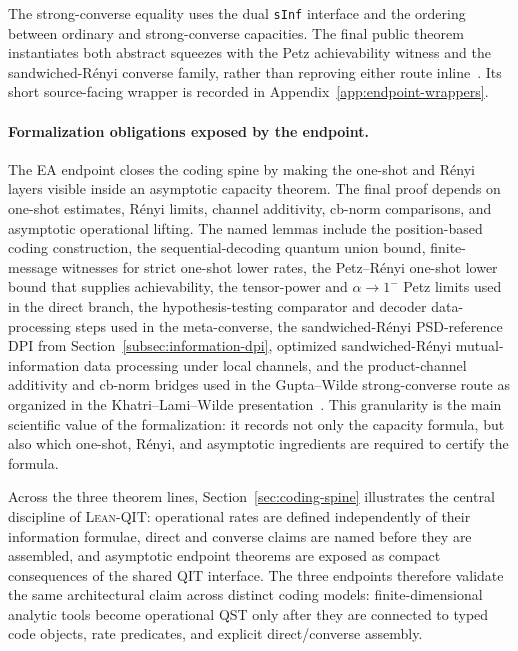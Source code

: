 \documentclass[10pt,a4paper]{article}
\DeclareRobustCommand{\LeanQIT}{\textnormal{\textsc{Lean-QIT}}}
\begin{document}
The strong-converse equality uses the dual \texttt{sInf} interface and the
ordering between ordinary and strong-converse capacities.  The final public
theorem instantiates both abstract squeezes with the Petz achievability witness
and the sandwiched-R\'enyi converse family, rather than reproving either route
inline~\cite{Bennett1999,Bennett2002,GuptaWilde2013,KhatriLamiWilde2025Principles}.
Its short source-facing wrapper is recorded in
Appendix~\ref{app:endpoint-wrappers}.

\paragraph{Formalization obligations exposed by the endpoint.}
The EA endpoint closes the coding spine by making the one-shot and R\'enyi
layers visible inside an asymptotic capacity theorem.  The final proof
depends on one-shot estimates, R\'enyi limits, channel additivity, cb-norm
comparisons, and asymptotic operational lifting.  The named lemmas include
the position-based coding construction, the sequential-decoding quantum union
bound, finite-message witnesses for strict one-shot lower rates, the
Petz--R\'enyi one-shot lower bound that supplies achievability, the
tensor-power and $\alpha\to1^{-}$ Petz limits used in the direct branch,
the hypothesis-testing comparator and decoder data-processing steps used in
the meta-converse, the sandwiched-R\'enyi PSD-reference DPI from
Section~\ref{subsec:information-dpi}, optimized sandwiched-R\'enyi
mutual-information data processing under local channels, and the
product-channel additivity and cb-norm bridges used in the
Gupta--Wilde strong-converse route as organized in the
Khatri--Lami--Wilde presentation~\cite{DattaHsieh2011,AnshuJainWarsi2019,QiWangWilde2018,OskoueiManciniWilde2019,MatthewsWehner2012,GuptaWilde2013,KhatriLamiWilde2025Principles}.
This granularity is the
main scientific value of the formalization: it records not only the capacity
formula, but also which one-shot, R\'enyi, and asymptotic ingredients are
required to certify the formula.

Across the three theorem lines, Section~\ref{sec:coding-spine} illustrates
the central discipline of \LeanQIT{}: operational rates are defined
independently of their information formulae, direct and converse claims are
named before they are assembled, and asymptotic endpoint theorems are exposed
as compact consequences of the shared QIT interface.  The three endpoints
therefore validate the same architectural claim across distinct coding models:
finite-dimensional analytic tools become operational QST only after they are
connected to typed code objects, rate predicates, and explicit direct/converse
assembly.
	
\end{document}
